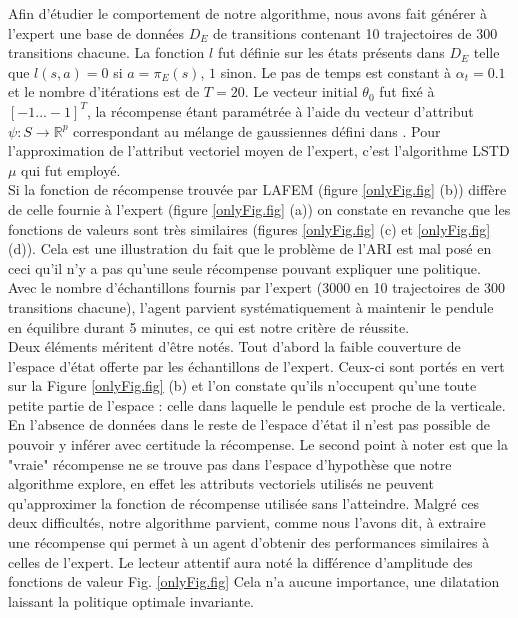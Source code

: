 \documentclass[publibook-draft]{CAp2012}
\begin{document}
Afin d'étudier le comportement de notre algorithme, nous avons fait générer à l'expert une base de données $D_E$ de transitions contenant 10 trajectoires de 300 transitions chacune. La fonction $l$ fut définie sur les états présents dans $D_E$ telle que $l(s,a) = 0$ si $a=\pi_E(s)$, $1$ sinon. Le pas de temps est constant à $\alpha_t = 0.1$ et le nombre d'itérations est de $T=20$. Le vecteur initial $\theta_0$ fut fixé à $[-1...-1]^T$, la récompense étant paramétrée à l'aide du vecteur d'attribut $\psi : S \rightarrow \mathbb{R}^p$ correspondant au mélange de gaussiennes défini dans \cite{lagoudakis2003least}. Pour l'approximation de l'attribut vectoriel moyen de l'expert, c'est l'algorithme LSTD$\mu$ qui fut employé.\\


Si la fonction de récompense trouvée par LAFEM (figure \ref{onlyFig.fig} (b)) diffère de celle fournie à l'expert (figure \ref{onlyFig.fig} (a)) on constate en revanche que les fonctions de valeurs sont très similaires (figures \ref{onlyFig.fig} (c) et \ref{onlyFig.fig} (d)). Cela est une illustration du fait que le problème de l'ARI est mal posé en ceci qu'il n'y a pas qu'une seule récompense pouvant expliquer une politique.\\

Avec le nombre d'échantillons fournis par l'expert (3000 en 10 trajectoires de 300 transitions chacune), l'agent parvient systématiquement à maintenir le pendule en équilibre durant 5 minutes, ce qui est notre critère de réussite.\\

Deux éléments méritent d'être notés. Tout d'abord la faible couverture de l'espace d'état offerte par les échantillons de l'expert. Ceux-ci sont portés en vert sur la Figure \ref{onlyFig.fig} (b) et l'on constate qu'ils n'occupent qu'une toute petite partie de l'espace : celle dans laquelle le pendule est proche de la verticale. En l'absence de données dans le reste de l'espace d'état il n'est pas possible de pouvoir y inférer avec certitude la récompense. Le second point à noter est que la "vraie" récompense ne se trouve pas dans l'espace d'hypothèse que notre algorithme explore, en effet les attributs vectoriels utilisés ne peuvent qu'approximer la fonction de récompense utilisée sans l'atteindre. Malgré ces deux difficultés, notre algorithme parvient, comme nous l'avons dit, à extraire une récompense qui permet à un agent d'obtenir des performances similaires à celles de l'expert. Le lecteur attentif aura noté la différence d'amplitude des fonctions de valeur Fig. \ref{onlyFig.fig} Cela n'a aucune importance, une dilatation laissant la politique optimale invariante.
\end{document}
